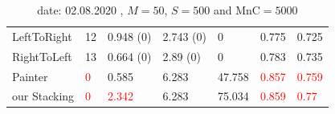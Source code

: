 \documentclass{beamer}
\newcommand{\red}{\textcolor{red}}
\begin{document}
\begin{frame}
\begin{table}[!h]
\begin{table}[!h]
\begin{center}
{\begin{tabular}{| l || p{1.3cm} | p{1.7cm} | p{1.7cm} | p{1.5cm} | p{1.5cm} | p{1.5cm} |}
      LeftToRight  & 12      & 0.948 (0)    & 2.743 (0)    & 0             & 0.775           & 0.725         \\

      RightToLeft  & 13      & 0.664 (0)    & 2.89 (0)     & 0             & 0.783           & 0.735         \\
\hline
      Painter      &\red 0       & 0.585        & 6.283        & 47.758        & \red{ 0.857  }         & \red{ 0.759  }       \\

      our Stacking &\red 0       & \red{2.342}        & 6.283        & 75.034        & \red{ 0.859 }     &     \red{ 0.77 }        \\

      \hline
    \end{tabular}}
  \end{center}
 \caption{
  date: 02.08.2020  , $M=50$, $S=500$ and $\text{MnC}=5000$ }
\end{table}
\end{table}

\end{frame}
\end{document}
